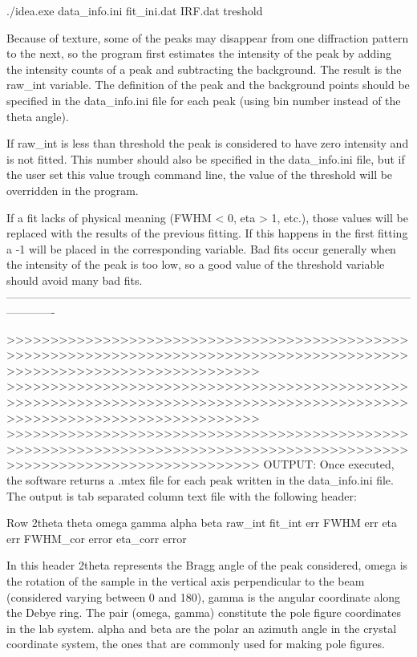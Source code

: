 ./idea.exe data_info.ini fit_ini.dat IRF.dat treshold

Because of texture, some of the peaks may disappear from one diffraction pattern to the next, so the program first estimates the intensity of the peak by adding the intensity counts of a peak and subtracting the background. The result is the raw_int variable. The definition of the peak and the background points should be specified in the data_info.ini file for each peak (using bin number instead of the theta angle).

If raw_int is less than threshold the peak is considered to have zero intensity and is not fitted. This number should also be specified in the data_info.ini file, but if the user set this value trough command line, the value of the threshold will be overridden in the program.

If a fit lacks of physical meaning (FWHM < 0, eta > 1, etc.), those values will be replaced with the results of the previous fitting. If this happens in the first fitting a -1 will be placed in the corresponding variable. Bad fits occur generally when the intensity of the peak is too low, so a good value of the threshold variable should avoid many bad fits.
-------------------------------------------------------------------------------------------------------------------------

>>>>>>>>>>>>>>>>>>>>>>>>>>>>>>>>>>>>>>>>>>>>>>>>>>>>>>>>>>>>>>>>>>>>>>>>>>>>>>>>>>>>>>>>>>>>>>>>>>>>>>>>>>>>>>>>>>>>>>>>>
>>>>>>>>>>>>>>>>>>>>>>>>>>>>>>>>>>>>>>>>>>>>>>>>>>>>>>>>>>>>>>>>>>>>>>>>>>>>>>>>>>>>>>>>>>>>>>>>>>>>>>>>>>>>>>>>>>>>>>>>>
>>>>>>>>>>>>>>>>>>>>>>>>>>>>>>>>>>>>>>>>>>>>>>>>>>>>>>>>>>>>>>>>>>>>>>>>>>>>>>>>>>>>>>>>>>>>>>>>>>>>>>>>>>>>>>>>>>>>>>>>>
OUTPUT:
Once executed, the software returns a .mtex file for each peak written in the data_info.ini file. The output is tab separated column text file with the following
header:

Row 2theta theta  omega gamma alpha  beta raw_int fit_int  err FWHM err eta err FWHM_cor error eta_corr error

In this header 2theta represents the Bragg angle of the peak considered, omega is the rotation of the sample in the vertical axis perpendicular to the beam (considered varying between 0 and 180), gamma is the angular coordinate along the Debye ring. The pair (omega, gamma) constitute the pole figure coordinates in the lab system. alpha and beta are the polar an azimuth angle in the crystal coordinate system, the ones that are commonly used for making pole figures.

